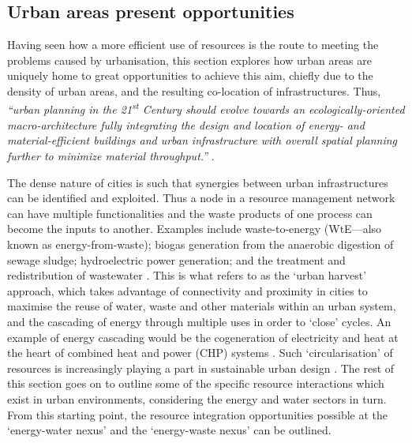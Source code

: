 \subsection{Urban areas present opportunities}
\label{sec:urbanOpps}
Having seen how a more efficient use of resources is the route to meeting the problems caused by urbanisation, this section explores how urban areas are uniquely home to great opportunities to achieve this aim, chiefly due to the density of urban areas, and the resulting co-location of infrastructures. Thus, \emph{``urban planning in the 21\textsuperscript{st} Century should evolve towards an ecologically-oriented macro-architecture fully integrating the design and location of energy- and material-efficient buildings and urban infrastructure with overall spatial planning further to minimize material throughput.''} \citep{Rees1999}. 

The dense nature of cities is such that synergies between urban infrastructures can be identified and exploited. Thus a node in a resource management network can have multiple functionalities and the waste products of one process can become the inputs to another. Examples include waste-to-energy (WtE---also known as energy-from-waste); biogas generation from the anaerobic digestion of sewage sludge; hydroelectric power generation; and the treatment and redistribution of wastewater \citep{Kharrazi2012}. This is what \citet{Leduc2010} refers to as the `urban harvest' approach, which takes advantage of connectivity and proximity in cities to maximise the reuse of water, waste and other materials within an urban system, and the cascading of energy through multiple uses in order to `close' cycles. An example of energy cascading would be the cogeneration of electricity and heat at the heart of combined heat and power (CHP) systems \citep{Grubler2009}. Such `circularisation' of resources is increasingly playing a part in sustainable urban design \citep{Meijer2011}. The rest of this section goes on to outline some of the specific resource interactions which exist in urban environments, considering the energy and water sectors in turn. From this starting point, the resource integration opportunities possible at the `energy-water nexus' and the `energy-waste nexus' can be outlined.

